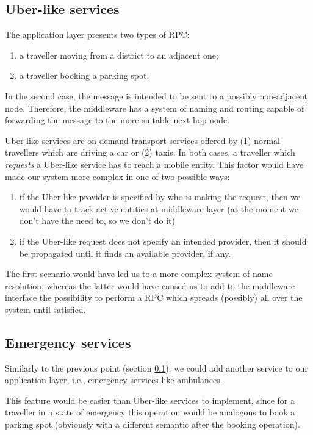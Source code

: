 \subsection{Uber-like services}\label{sec:future-uber}
The application layer presents two types of RPC:

\begin{enumerate}
  \item a traveller moving from a district to an adjacent one;
  \item a traveller booking a parking spot.
\end{enumerate}

In the second case, the message is intended to be sent to a possibly
non-adjacent node. Therefore, the middleware has a system of naming and routing
capable of forwarding the message to the more suitable next-hop node.

Uber-like services are on-demand transport services offered by (1) normal
travellers which are driving a car or (2) taxis. In both cases, a traveller
which \textit{requests} a Uber-like service has to reach a mobile entity.
This factor would have made our system more complex in one of two possible
ways:

\begin{enumerate}
  \item if the Uber-like provider is specified by who is making the request,
    then we would have to track active entities at middleware layer (at the
    moment we don't have the need to, so we don't do it)
  \item if the Uber-like request does not specify an intended provider, then it
    should be propagated until it finds an available provider, if any.
\end{enumerate}

The first scenario would have led us to a more complex system of name
resolution, whereas the latter would have caused us to add to the middleware
interface the possibility to perform a RPC which spreads (possibly) all over
the system until satisfied.

\subsection{Emergency services}
Similarly to the previous point (section \ref{sec:future-uber}), we could add
another service to our application layer, i.e., emergency services like
ambulances.

This feature would be easier than Uber-like services to implement, since for a
traveller in a state of emergency this operation would be analogous to book a
parking spot (obviously with a different semantic after the booking operation).

